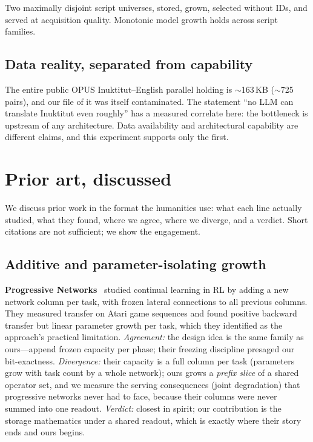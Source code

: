 \documentclass[11pt]{article}
\theoremstyle{definition}\newtheorem{definition}{Definition}
\theoremstyle{remark}\newtheorem{remark}{Remark}
\begin{document}
Two maximally disjoint script universes, stored, grown, selected without IDs, and served
at acquisition quality. Monotonic model growth holds across script families.

\subsection{Data reality, separated from capability}

The entire public OPUS Inuktitut--English parallel holding is $\sim$163\,KB ($\sim$725
pairs), and our file of it was itself contaminated. The statement ``no LLM can translate
Inuktitut even roughly'' has a measured correlate here: the bottleneck is upstream of any
architecture. Data availability and architectural capability are different claims, and
this experiment supports only the first.

\section{Prior art, discussed}
\label{sec:prior}

We discuss prior work in the format the humanities use: what each line actually studied,
what they found, where we agree, where we diverge, and a verdict. Short citations are not
sufficient; we show the engagement.

\subsection{Additive and parameter-isolating growth}
\label{sec:prior:growth}

\textbf{Progressive Networks}~\cite{pgn} studied continual learning in RL by adding a
new network column per task, with frozen lateral connections to all previous columns.
They measured transfer on Atari game sequences and found positive backward transfer but
linear parameter growth per task, which they identified as the approach's practical
limitation. \emph{Agreement:} the design idea is the same family as ours---append frozen
capacity per phase; their freezing discipline presaged our bit-exactness. \emph{Divergence:}
their capacity is a full column per task (parameters grow with task count by a whole
network); ours grows a \emph{prefix slice} of a shared operator set, and we measure the
serving consequences (joint degradation) that progressive networks never had to face,
because their columns were never summed into one readout. \emph{Verdict:} closest in
spirit; our contribution is the storage mathematics under a shared readout, which is
exactly where their story ends and ours begins.
\end{document}
